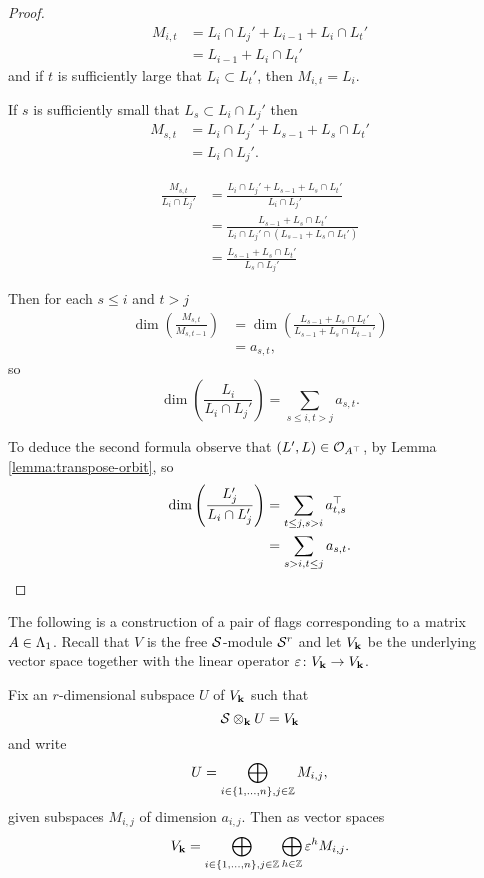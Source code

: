 \documentclass[a4paper, 11pt, twoside]{report}
\begin{document}
\begin{proof}
\begin{align*}
M_{i,t}
&= L_i\cap L_j' + L_{i-1} + L_i\cap L_t'\\
&= L_{i-1} + L_i\cap L_t'
\end{align*}
and if $t$ is sufficiently large that $L_i\subset L_t'$, then $M_{i,t}=L_i$.

If $s$ is sufficiently small that $L_s\subset L_i\cap L_j'$ then
\begin{align*}
M_{s,t}
&= L_i\cap L_j' + L_{s-1} + L_s\cap L_t'\\
&= L_i\cap L_j'.
\end{align*}

\begin{align*}
\frac{M_{s,t}}{L_i\cap L_j'}
&= \frac{L_i\cap L_j' + L_{s-1} + L_s\cap L_t'}{L_i\cap L_j'}\\
&= \frac{L_{s-1} + L_s\cap L_t'}{L_i\cap L_j'\cap(L_{s-1} + L_s\cap L_t')}\\
&= \frac{L_{s-1} + L_s\cap L_t'}{L_s\cap L_j'}
\end{align*}

Then for each $s\le i$ and $t>j$
\begin{align*}
\dim\left(\frac{M_{s,t}}{M_{s,t-1}}\right)
&= \dim\left(\frac{L_{s-1} + L_s\cap L_t'}{L_{s-1} + L_s\cap L_{t-1}'}\right)\\
&= a_{s,t},
\end{align*}
so
\begin{equation*}
\dim\left(\frac{L_i}{L_i\cap L_j'}\right) = \sum_{s\le i, t>j} a_{s,t}.
\end{equation*}

To deduce the second formula observe that $(L',L)\in\mathcal{O}_{A^\top}$, by Lemma \ref{lemma:transpose-orbit}, so
\begin{align*}
\dim\left(\frac{L_j'}{L_i\cap L_j'}\right)
&= \sum_{t\le j, s>i} a_{t,s}^\top\\
&= \sum_{s>i, t\le j} a_{s,t}.
\end{align*}
\end{proof}

The following is a construction of a pair of flags corresponding to a matrix $A\in\Lambda_1{}$. Recall that $V$ is the free $\mathcal{S}$-module $\mathcal{S}^r$ and let $V_{\mathbf{k}}$ be the underlying vector space together with the linear operator $\varepsilon\colon V_{\mathbf{k}}\to V_{\mathbf{k}}$.

Fix an $r$-dimensional subspace $U$ of $V_{\mathbf{k}}$ such that
\begin{equation*}
\mathcal{S}\otimes_{\mathbf{k}}U = V_{\mathbf{k}}
\end{equation*}
and write
\begin{equation*}
U = \bigoplus_{i\in\{1,\ldots,n\},j\in\mathbb{Z}} M_{i,j},
\end{equation*}
given subspaces $M_{i,j}$ of dimension $a_{i,j}$. Then as vector spaces
\begin{equation*}
V_{\mathbf{k}} = \bigoplus_{i\in\{1,\ldots,n\},j\in\mathbb{Z}}\bigoplus_{h\in\mathbb{Z}} \varepsilon^hM_{i,j}.
\end{equation*}
\end{document}
